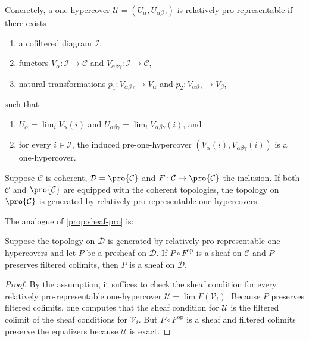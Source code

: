 \noindent Concretely, a one-hypercover $\mathcal{U} = (U_{\alpha}, U_{\alpha \beta \gamma})$ is
relatively pro-representable if there exists
\begin{enumerate}
    \item a cofiltered diagram $\mathcal{I}$,
    \item functors $V_{\alpha}\colon \mathcal{I} \to \mathcal{C}$ and
        $V_{\alpha \beta \gamma}\colon \mathcal{I} \to \mathcal{C}$,
    \item natural transformations $p_1 \colon V_{\alpha \beta \gamma} \to V_{\alpha}$ and
        $p_2\colon V_{\alpha \beta \gamma} \to V_{\beta}$,
\end{enumerate}
such that
\begin{enumerate}
    \item $U_{\alpha} = \lim_i V_{\alpha}(i)$ and $U_{\alpha \beta \gamma} = \lim_i V_{\alpha \beta \gamma}(i)$, and
    \item for every $i \in \mathcal{I}$, the induced pre-one-hypercover $(V_{\alpha}(i), V_{\alpha \beta \gamma}(i))$
        is a one-hypercover.
\end{enumerate}

\begin{example}
    Suppose $\mathcal{C}$ is coherent, $\mathcal{D} = \pro{\mathcal{C}}$ and
    $F \colon \mathcal{C} \to \pro{\mathcal{C}}$ the inclusion. If
    both $\mathcal{C}$ and $\pro{\mathcal{C}}$ are equipped with the coherent topologies,
    the topology on $\pro{\mathcal{C}}$ is generated by relatively pro-representable
    one-hypercovers.
\end{example}

The analogue of \ref{prop:sheaf-pro} is:

\begin{proposition}
    Suppose the topology on $\mathcal{D}$ is generated by relatively pro-representable
    one-hypercovers and let $P$ be a presheaf on $\mathcal{D}$. If
    $P \circ F^{\mathrm{op}}$ is a sheaf on $\mathcal{C}$ and
    $P$ preserves filtered colimits, then $P$ is a sheaf on $\mathcal{D}$.
    \label{prop:sheaf-relatively-representable-generated}
    \leanok
\end{proposition}

\begin{proof}
    \leanok
    By the assumption, it suffices to check the sheaf condition for every
    relatively pro-representable one-hypercover $\mathcal{U} = \lim F(\mathcal{V}_i)$.
    Because $P$ preserves filtered colimits, one computes that
    the sheaf condition for $\mathcal{U}$ is the filtered colimit
    of the sheaf conditions for $\mathcal{V}_i$. But
    $P \circ F^{\mathrm{op}}$ is a sheaf and filtered colimits preserve
    the equalizers because $\mathcal{U}$ is exact.
\end{proof}

